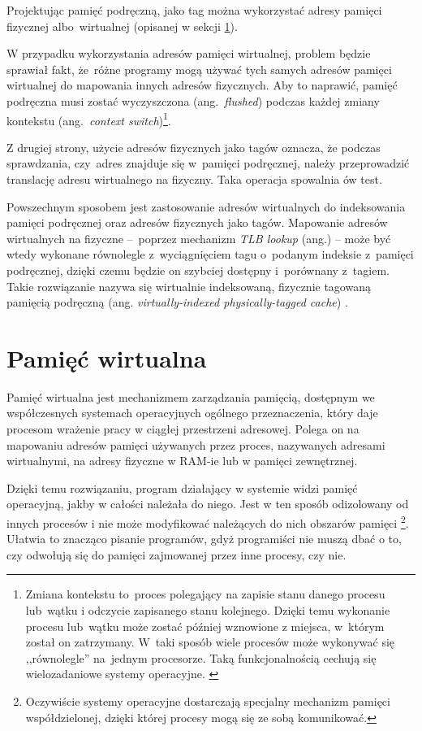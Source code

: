 Projektując pamięć podręczną, jako tag można wykorzystać adresy pamięci fizycznej albo~wirtualnej (opisanej w sekcji \ref{sec:VirtualMemory}).

W przypadku wykorzystania adresów pamięci wirtualnej, problem będzie sprawiał fakt, że~różne programy mogą używać tych samych adresów pamięci wirtualnej do mapowania innych adresów fizycznych. Aby to naprawić, pamięć podręczna musi zostać wyczyszczona (ang.~\textit{flushed}) podczas każdej zmiany kontekstu (ang.~\textit{context switch})\footnote{Zmiana kontekstu to~proces polegający na zapisie stanu danego procesu lub~wątku i odczycie zapisanego stanu kolejnego. Dzięki temu wykonanie procesu lub~wątku może zostać później wznowione z miejsca, w~którym został on zatrzymany. W~taki sposób wiele procesów może wykonywać się ,,równolegle'' na~jednym procesorze. Taką funkcjonalnością cechują się wielozadaniowe systemy operacyjne. \cite{ContextSwitching}}.

Z drugiej strony, użycie adresów fizycznych jako tagów oznacza, że podczas sprawdzania, czy~adres znajduje się w~pamięci podręcznej, należy przeprowadzić translację adresu wirtualnego na fizyczny. Taka operacja spowalnia ów test.

Powszechnym sposobem jest zastosowanie adresów wirtualnych do indeksowania pamięci podręcznej oraz adresów fizycznych jako tagów. Mapowanie adresów wirtualnych na fizyczne --~poprzez mechanizm \textit{TLB lookup} (ang.) -- może być wtedy wykonane równolegle z~wyciągnięciem tagu o~podanym indeksie z~pamięci podręcznej, dzięki czemu będzie on szybciej dostępny i~porównany z~tagiem. Takie rozwiązanie nazywa się wirtualnie indeksowaną, fizycznie tagowaną pamięcią podręczną (ang. \textit{virtually-indexed physically-tagged cache}) \cite{ModernMicroprocessors90MinGuide}.

\section{Pamięć wirtualna}
\label{sec:VirtualMemory}
Pamięć wirtualna jest mechanizmem zarządzania pamięcią, dostępnym we współczesnych systemach operacyjnych ogólnego przeznaczenia, który daje procesom wrażenie pracy w ciągłej przestrzeni adresowej. Polega on na mapowaniu adresów pamięci używanych przez proces, nazywanych adresami wirtualnymi, na adresy fizyczne w RAM-ie lub w pamięci zewnętrznej.

Dzięki temu rozwiązaniu, program działający w systemie widzi pamięć operacyjną, jakby w całości należała do niego. Jest w ten sposób odizolowany od innych procesów i nie może modyfikować należących do nich obszarów pamięci \footnote{Oczywiście systemy operacyjne dostarczają specjalny mechanizm pamięci współdzielonej, dzięki której procesy mogą się ze sobą komunikować.}. Ułatwia to znacząco pisanie programów, gdyż programiści nie muszą dbać o to, czy odwołują się do pamięci zajmowanej przez inne procesy, czy nie.

